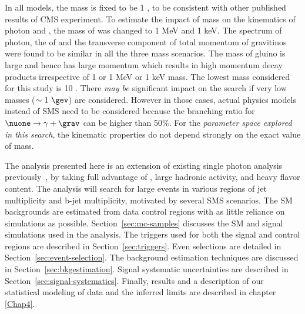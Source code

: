 In all models, the mass \grav is fixed to be 1 \gev, to be consistent with other published results of CMS experiment. 
To estimate the impact of \grav mass on the kinematics of photon and \grav, the mass of \grav was changed to 1 MeV and 1 keV. The \pt
spectrum of photon, the \pt of \grav and the transverse component of total momentum of gravitinos were found to be similar in all the
three \grav mass scenarios. The mass of gluino is large and hence \nuone has large momentum which 
results in high momentum decay products irrespective of 1 \gev or 1 MeV or 1 keV \grav mass.
The lowest \nuone mass considered for this study is 10 \gev. There \textit{may be} significant impact on the search if very low \nuone 
masses ($\sim 1\ \gev$) are considered. However in those cases, actual physics models instead of SMS need to be considered because the
branching ratio for $\nuone \to \gamma+\grav$ can be higher than 50\%. For the \textit{parameter
space explored in this search}, the kinematic properties do not depend strongly on the exact value of \grav mass.

The analysis presented here \cite{Sirunyan:2019hzr} is an extension of existing single photon analysis previously~\cite{Sirunyan:2017yse}, by taking full advantage
of \ptmiss, large hadronic activity, and heavy flavor content.  The analysis will search for large \ptmiss events
in various regions of jet multiplicity and b-jet multiplicity, motivated by several SMS scenarios.  The 
SM backgrounds are estimated from data control regions with as little reliance on simulations as possible.
Section~\ref{sec:mc-samples} discusses the SM and signal simulations used in the analysis.
The triggers used for both the signal and control regions are described in Section~\ref{sec:triggers}.   
Even selections are detailed in Section~\ref{sec:event-selection}. The background 
estimation techniques are discussed in Section~\ref{sec:bkgestimation}.  Signal systematic uncertainties are described in Section~\ref{sec:signal-systematics}.
Finally, results and a description of our statistical modeling of data and the inferred limits are described 
in chapter \ref{Chap4}.

